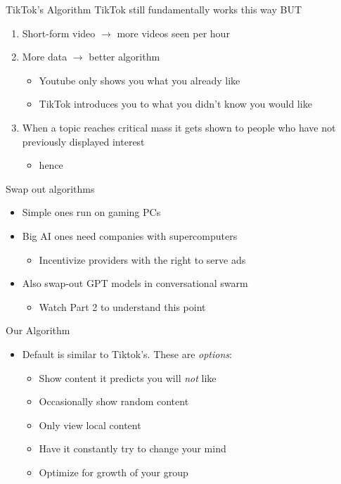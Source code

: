 \documentclass[aspectratio=169]{beamer}
\begin{document}
\begin{frame}{TikTok's Algorithm}
\vspace{-0.6in}
TikTok still fundamentally works this way BUT
\begin{enumerate}
    \item Short-form video $\rightarrow$ more videos seen per hour
    \item More data $\rightarrow$ better algorithm
    \begin{itemize}
        \item Youtube only shows you what you already like
        \item TikTok introduces you to what you didn't know you would like
    \end{itemize}
    \item When a topic reaches critical mass it gets shown to people who have not previously displayed interest
    \begin{itemize}
        \item hence 
    \end{itemize}
\end{enumerate}
\end{frame}

\begin{frame}{Swap out algorithms}
\vspace{-0.6in}
\begin{itemize}
    \item Simple ones run on gaming PCs
    \item Big AI ones need companies with supercomputers
    \begin{itemize}
        \item Incentivize providers with the right to serve ads
    \end{itemize}
    \item Also swap-out GPT models in conversational swarm
    \begin{itemize}
        \item Watch Part 2 to understand this point
    \end{itemize}
\end{itemize}
\end{frame}

\begin{frame}{Our Algorithm}
\vspace{-0.7in}
\begin{itemize}
    \item Default is similar to Tiktok's. These are \textit{options}:
    \begin{itemize}
        \item Show content it predicts you will \textit{not} like
        \item Occasionally show random content
        \item Only view local content
        \item Have it constantly try to change your mind
        \item Optimize for growth of your group
    \end{itemize}
\end{itemize}
\end{frame}
\end{document}
